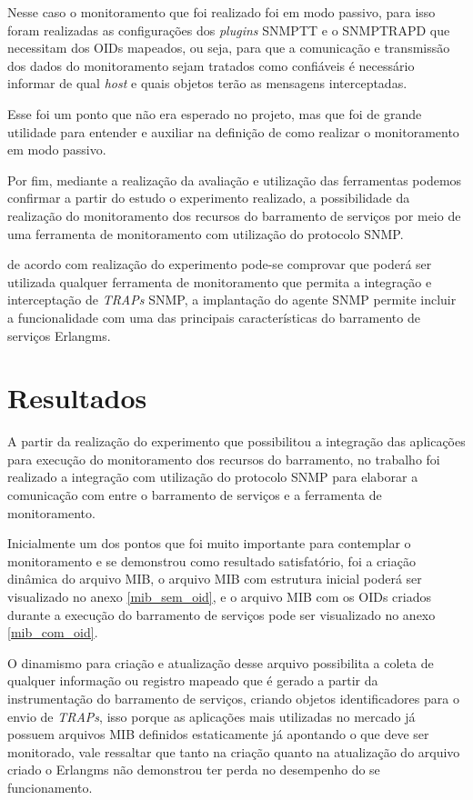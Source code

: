 Nesse caso o monitoramento que foi realizado foi em modo passivo, para isso foram realizadas as configurações dos \textit{plugins} \acrshort{SNMPTT} e o SNMPTRAPD que necessitam dos \acrshort{OID}s mapeados, ou seja, para que a comunicação e transmissão dos dados do monitoramento sejam tratados como confiáveis é necessário informar de qual \textit{host} e quais objetos terão as mensagens interceptadas.

Esse foi um ponto que não era esperado no projeto, mas que foi de grande utilidade para entender e auxiliar na definição de como realizar o monitoramento em modo passivo.   

Por fim, mediante a realização da avaliação e utilização das ferramentas podemos confirmar a partir do estudo o experimento realizado, a possibilidade da realização do monitoramento dos recursos do barramento de serviços por meio de uma ferramenta de monitoramento com utilização do protocolo \acrshort{SNMP}. 

de acordo com realização do experimento pode-se comprovar que poderá ser utilizada qualquer ferramenta de monitoramento que permita a integração e interceptação de \textit{TRAPs} \acrshort{SNMP}, a implantação do agente \acrshort{SNMP} permite incluir a funcionalidade com uma das principais características do barramento de serviços Erlangms.   



\section{Resultados}
\label{resultados}

A partir da realização do experimento que possibilitou a integração das aplicações para execução do monitoramento dos recursos do barramento, no trabalho foi realizado a integração com utilização do protocolo \acrshort{SNMP} para elaborar a comunicação com entre o barramento de serviços e a ferramenta de monitoramento. 

Inicialmente um dos pontos que foi muito importante para contemplar o monitoramento e se demonstrou como resultado satisfatório, foi a criação dinâmica do arquivo MIB, o arquivo MIB com estrutura inicial poderá ser visualizado no anexo \ref{mib_sem_oid}, e o arquivo MIB com os \acrshort{OID}s criados durante a execução do barramento de serviços pode ser visualizado no anexo \ref{mib_com_oid}. 

O dinamismo para criação e atualização desse arquivo possibilita a coleta de qualquer informação ou registro mapeado que é gerado a partir da instrumentação do barramento de serviços, criando objetos identificadores para o envio de \textit{TRAPs}, isso porque as aplicações mais utilizadas no mercado já possuem arquivos MIB definidos estaticamente já apontando o que deve ser monitorado, vale ressaltar que tanto na criação quanto na atualização do arquivo criado o Erlangms não demonstrou ter perda no desempenho do se funcionamento.

